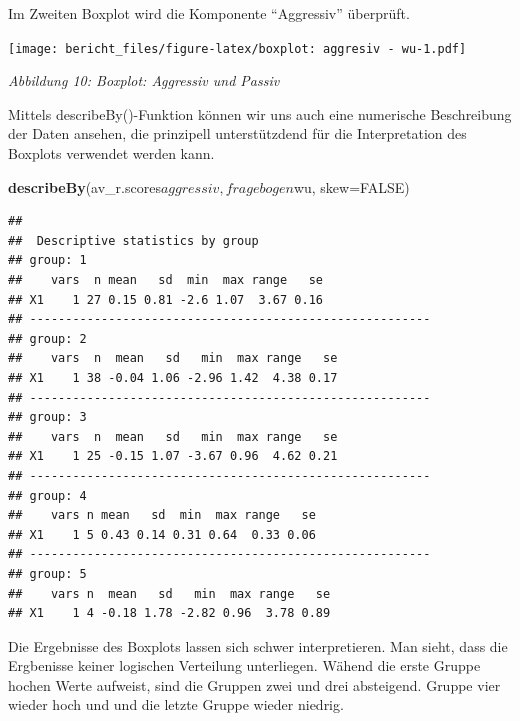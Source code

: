 \documentclass[]{article}
\newenvironment{Shaded}{\begin{snugshade}}{\end{snugshade}}
\newcommand{\KeywordTok}[1]{\textcolor[rgb]{0.13,0.29,0.53}{\textbf{{#1}}}}
\newcommand{\DataTypeTok}[1]{\textcolor[rgb]{0.13,0.29,0.53}{{#1}}}
\newcommand{\StringTok}[1]{\textcolor[rgb]{0.31,0.60,0.02}{{#1}}}
\newcommand{\OtherTok}[1]{\textcolor[rgb]{0.56,0.35,0.01}{{#1}}}
\newcommand{\NormalTok}[1]{{#1}}
\begin{document}
Im Zweiten Boxplot wird die Komponente ``Aggressiv'' überprüft.

\begin{Shaded}
\end{Shaded}

\texttt{[image: bericht\_files/figure-latex/boxplot: aggresiv - wu-1.pdf]}

\begin{center}
\textit{Abbildung 10: Boxplot: Aggressiv und Passiv}
\bigskip
\end{center}

Mittels describeBy()-Funktion können wir uns auch eine numerische
Beschreibung der Daten ansehen, die prinzipell unterstützdend für die
Interpretation des Boxplots verwendet werden kann.

\begin{Shaded}
\begin{Highlighting}[]
\KeywordTok{describeBy}\NormalTok{(av_r.scores$aggressiv, fragebogen$wu, }\DataTypeTok{skew=}\OtherTok{FALSE}\NormalTok{)}
\end{Highlighting}
\end{Shaded}

\begin{verbatim}
## 
##  Descriptive statistics by group 
## group: 1
##    vars  n mean   sd  min  max range   se
## X1    1 27 0.15 0.81 -2.6 1.07  3.67 0.16
## -------------------------------------------------------- 
## group: 2
##    vars  n  mean   sd   min  max range   se
## X1    1 38 -0.04 1.06 -2.96 1.42  4.38 0.17
## -------------------------------------------------------- 
## group: 3
##    vars  n  mean   sd   min  max range   se
## X1    1 25 -0.15 1.07 -3.67 0.96  4.62 0.21
## -------------------------------------------------------- 
## group: 4
##    vars n mean   sd  min  max range   se
## X1    1 5 0.43 0.14 0.31 0.64  0.33 0.06
## -------------------------------------------------------- 
## group: 5
##    vars n  mean   sd   min  max range   se
## X1    1 4 -0.18 1.78 -2.82 0.96  3.78 0.89
\end{verbatim}

Die Ergebnisse des Boxplots lassen sich schwer interpretieren. Man
sieht, dass die Ergbenisse keiner logischen Verteilung unterliegen.
Wähend die erste Gruppe hochen Werte aufweist, sind die Gruppen zwei und
drei absteigend. Gruppe vier wieder hoch und und die letzte Gruppe
wieder niedrig.
\end{document}
